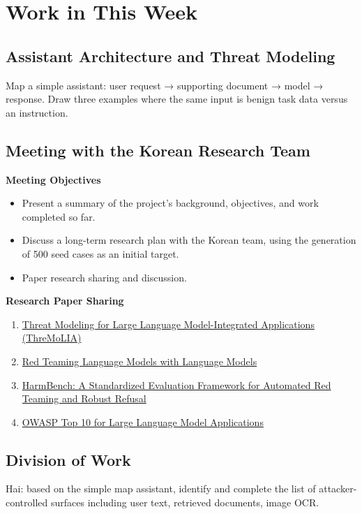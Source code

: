 \documentclass[a4paper,12pt]{report}
\begin{document}
\newpage
\chapter{Work in This Week}

\section{Assistant Architecture and Threat Modeling}
Map a simple assistant: user request → supporting document → model → response. Draw three examples where the same input is benign task data versus an instruction.

\section{Meeting with the Korean Research Team}


\textbf{Meeting Objectives}
\begin{itemize}
    \item Present a summary of the project's background, objectives,
    and work completed so far.

    \item Discuss a long-term research plan with the Korean team,
    using the generation of 500 seed cases as an initial target.

    \item Paper research sharing and discussion.
\end{itemize}

\textbf{Research Paper Sharing}
\begin{enumerate}
    \item \href{https://arxiv.org/pdf/2504.18369}{Threat Modeling for Large Language Model-Integrated Applications (ThreMoLIA)}
    \item \href{https://arxiv.org/pdf/2202.03286}{Red Teaming Language Models with Language Models}
    \item \href{https://arxiv.org/pdf/2402.04249}{HarmBench: A Standardized Evaluation Framework for Automated Red Teaming and Robust Refusal}
    \item \href{https://owasp.org/www-project-top-10-for-large-language-model-applications/}{OWASP Top 10 for Large Language Model Applications}
\end{enumerate}


\section{Division of Work}
\noindent
Hai: based on the simple map assistant, identify and complete the list of attacker-controlled
surfaces including user text, retrieved documents, image OCR.
\end{document}
